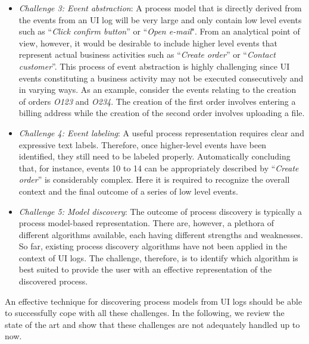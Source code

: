 \begin{itemize}
\item \textit{Challenge 3: Event abstraction}: A process model that is directly derived from the events from an UI log will be very large and only contain low level events such as ``\textit{Click confirm button}'' or ``\textit{Open e-mail}". From an analytical point of view, however,  it would be desirable to include higher level events that represent actual business activities such as ``\textit{Create order}'' or ``\textit{Contact customer}''. This process of event abstraction is highly challenging since UI events constituting a business activity may not be executed consecutively and in varying ways. As an example, consider the events relating to the creation of orders \textit{O123} and \textit{O234}. The creation of the first order involves entering a billing address while the creation of the second order involves uploading a file. 

\item \textit{Challenge 4: Event labeling}: A useful process representation requires clear and expressive text labels. Therefore, once higher-level events have been identified, they still need to be labeled properly. Automatically concluding that, for instance, events 10 to 14 can be appropriately described by ``\textit{Create order}'' is considerably complex. Here it is required to recognize the overall context and the final outcome of a series of low level events.  
 
\item  \textit{Challenge 5: Model discovery}: The outcome of process discovery is typically a process model-based representation. There are, however, a plethora of different algorithms available, each having different strengths and weaknesses. So far, existing process discovery algorithms have not been applied in the context of UI logs. The challenge, therefore, is to identify which algorithm is best suited to provide the user with an effective representation of the discovered process. 
 \end{itemize}

An effective technique for discovering process models from UI logs should be able to successfully cope with all these challenges. In the following, we review the state of the art and show that these challenges are not adequately handled up to now. 